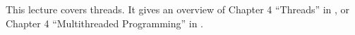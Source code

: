 This lecture covers threads.
It gives an overview of Chapter 4 ``Threads'' in 
\cite{Silberschatz2013intl,Silberschatz2013osc}, or Chapter 4 ``Multithreaded 
Programming'' in \cite{Silberschatz2009osc}.
